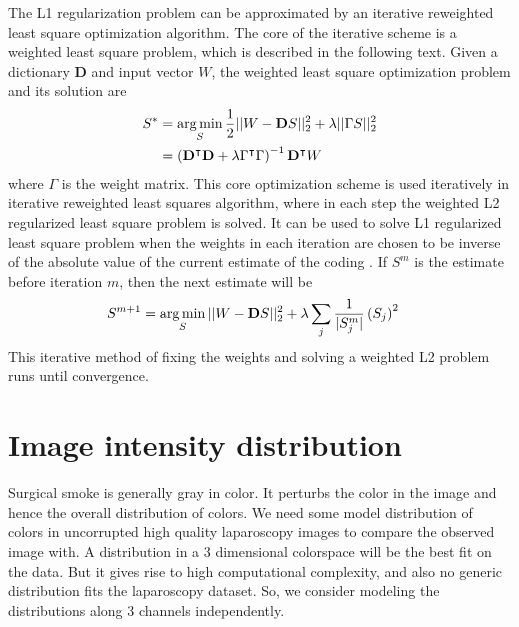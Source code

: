 The L1 regularization problem can be approximated by an iterative reweighted least square optimization algorithm. The core of the iterative scheme is a weighted least square problem, which is described in the following text. Given a dictionary $\mathbf{D}$ and input vector $W$, the weighted least square optimization problem and its solution are
\begin{align}
    S^* &= \operatorname*{arg\,min}_{S} \frac{1}{2} || W - \mathbf{D} S ||_2^2 + \lambda || \Gamma S ||_2^2 \label{eqn:wls}\\
    &= \left( \mathbf{D}^\intercal \mathbf{D} + \lambda \Gamma^\intercal \Gamma \right)^{-1} \mathbf{D}^\intercal W \label{eqn:wlsSolution}
\end{align}
where $\Gamma$ is the weight matrix. This core optimization scheme is used iteratively in iterative reweighted least squares algorithm, where in each step the weighted L2 regularized least square problem is solved. It can be used to solve L1 regularized least square problem when the weights in each iteration are chosen to be inverse of the absolute value of the current estimate of the coding \cite{chartrand2008iteratively}. If $S^m$ is the estimate before iteration $m$, then the next estimate will be
\begin{align}
    S^{m+1} &= \operatorname*{arg\,min}_{S} || W - \mathbf{D} S ||_2^2 + \lambda \sum_{j} \frac{1}{| S_j^m |} \left( S_j \right)^2 \label{eqn:irls_l1} 
\end{align}
This iterative method of fixing the weights and solving a weighted L2 problem runs until convergence.



\section{Image intensity distribution}
\label{sec:pcaDist}
Surgical smoke is generally gray in color. It perturbs the color in the image and hence the overall distribution of colors. We need some model distribution of colors in uncorrupted high quality laparoscopy images to compare the observed image with. A distribution in a 3 dimensional colorspace will be the best fit on the data. But it gives rise to high computational complexity, and also no generic distribution fits the laparoscopy dataset. So, we consider modeling the distributions along 3 channels independently.

